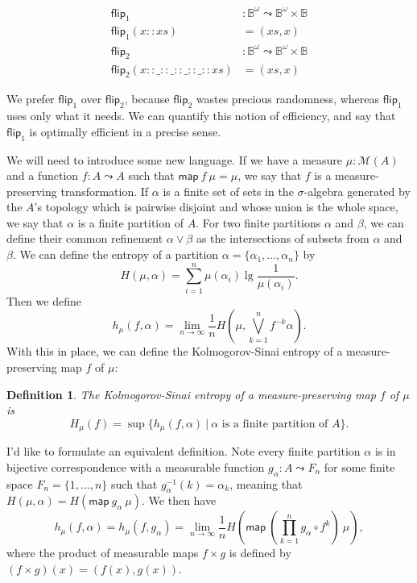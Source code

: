 \documentclass{article}           %
\newtheorem{definition}{Definition}
\newcommand{\map}[2]{\mathsf{map}\ {#1}\ {#2}}
\newcommand{\suchthat}{\ |\ }
\newcommand{\Dist}[1]{\mathcal{M}({#1})}
\newcommand{\bool}{\mathbb{B}}
\newcommand{\cons}{::}
\begin{document}
\begin{align*}
\mathsf{flip}_1 &: \bool^\omega \leadsto \bool^\omega \times \bool
\\ \mathsf{flip}_1 (x \cons xs) &= (xs, x)
\\ \mathsf{flip}_2 &: \bool^\omega \leadsto \bool^\omega \times \bool
\\ \mathsf{flip}_2 (x \cons \_ \cons \_ \cons \_ \cons \_ \cons xs) &= (xs, x)
\end{align*}

We prefer $\mathsf{flip}_1$ over $\mathsf{flip}_2$, because $\mathsf{flip}_2$ wastes precious randomness, whereas $\mathsf{flip}_1$ uses only what it needs. We can quantify this notion of efficiency, and say that $\mathsf{flip}_1$ is optimally efficient in a precise sense.

We will need to introduce some new language. If we have a measure $\mu : \Dist{A}$ and a function $f : A \leadsto A$ such that $\map{f}{\mu} = \mu$, we say that $f$ is a measure-preserving transformation. If $\alpha$ is a finite set of sets in the $\sigma$-algebra generated by the $A$'s topology which is pairwise disjoint and whose union is the whole space, we say that $\alpha$ is a finite partition of $A$. For two finite partitions $\alpha$ and $\beta$, we can define their common refinement $\alpha \vee \beta$ as the intersections of subsets from $\alpha$ and $\beta$. We can define the entropy of a partition $\alpha = \{\alpha_1, \ldots, \alpha_n\}$ by
\[
H(\mu, \alpha) = \sum_{i = 1}^n \mu(\alpha_i) \lg \frac{1}{\mu(\alpha_i)}.
\]
Then we define
\[
h_\mu(f, \alpha) = \lim_{n \to \infty} \frac{1}{n} H\left(\mu, \bigvee_{k = 1}^n f^{-k}\alpha  \right).
\]
With this in place, we can define the Kolmogorov-Sinai entropy of a measure-preserving map $f$ of $\mu$:

\begin{definition}
The \emph{Kolmogorov-Sinai entropy} of a measure-preserving map $f$ of $\mu$ is
\[
H_\mu(f) = \sup \{ h_\mu(f, \alpha) \suchthat \text{$\alpha$ is a finite partition of $A$} \}.
\]
\end{definition}

I'd like to formulate an equivalent definition. Note every finite partition $\alpha$ is in bijective correspondence with a measurable function $g_\alpha : A \leadsto F_n$ for some finite space $F_n = \{1, \ldots, n \}$ such that $g_\alpha^{-1}(k) = \alpha_k$, meaning that $H(\mu, \alpha) = H(\map{g_\alpha}{\mu})$. We then have
\[
h_\mu(f, \alpha) = h_\mu(f, g_\alpha) = \lim_{n \to \infty} \frac{1}{n} H\left( \map{\left(\prod_{k = 1}^n g_\alpha \circ f^k\right)} \mu \right),
\]
where the product of measurable maps $f \times g$ is defined by $(f \times g)(x) = (f(x), g(x))$.
\end{document}
